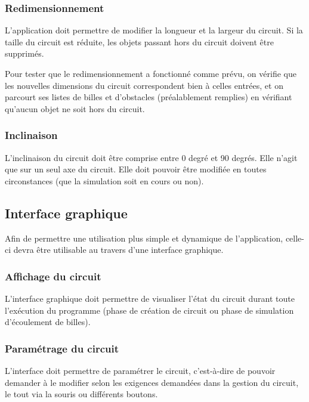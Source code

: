 \documentclass{report}
\begin{document}
\subsubsection{Redimensionnement}

L’application doit permettre de modifier la longueur et la largeur du circuit. Si la taille du circuit est réduite, les objets passant hors du circuit doivent être supprimés.

Pour tester que le redimensionnement a fonctionné comme prévu, on vérifie que les nouvelles dimensions du circuit correspondent bien à celles entrées, et on parcourt ses listes de billes et d’obstacles (préalablement remplies) en vérifiant qu’aucun objet ne soit hors du circuit.


\subsubsection{Inclinaison}

L’inclinaison du circuit doit être comprise entre 0 degré et 90 degrés. Elle n’agit que sur un seul axe du circuit. Elle doit pouvoir être modifiée en toutes circonstances (que la simulation soit en cours ou non).

\subsection{Interface graphique}

Afin de permettre une utilisation plus simple et dynamique de l’application, celle-ci devra être utilisable au travers d’une interface graphique.

\subsubsection{Affichage du circuit}

L’interface graphique doit permettre de visualiser l’état du circuit durant toute l’exécution du programme (phase de création de circuit ou phase de simulation d’écoulement de billes).

\subsubsection{Paramétrage du circuit}

L’interface doit permettre de paramétrer le circuit, c’est-à-dire de pouvoir demander à le modifier selon les exigences demandées dans la gestion du circuit, le tout via la souris ou différents boutons.
\end{document}
